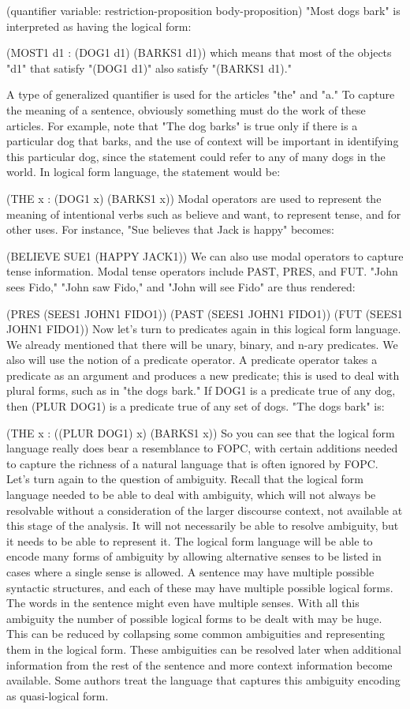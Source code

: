 (quantifier variable: restriction-proposition body-proposition)
"Most dogs bark" is interpreted as having the logical form:

(MOST1 d1 : (DOG1 d1) (BARKS1 d1))
which means that most of the objects "d1" that satisfy "(DOG1 d1)" also satisfy "(BARKS1 d1)."

A type of generalized quantifier is used for the articles "the" and "a." To capture the meaning of a sentence, obviously something must do the work of these articles. For example, note that "The dog barks" is true only if there is a particular dog that barks, and the use of context will be important in identifying this particular dog, since the statement could refer to any of many dogs in the world. In logical form language, the statement would be:

(THE x : (DOG1 x) (BARKS1 x)) 
Modal operators are used to represent the meaning of intentional verbs such as believe and want, to represent tense, and for other uses. For instance, "Sue believes that Jack is happy" becomes:

(BELIEVE SUE1 (HAPPY JACK1)) 
We can also use modal operators to capture tense information. Modal tense operators include PAST, PRES, and FUT. "John sees Fido," "John saw Fido," and "John will see Fido" are thus rendered:

(PRES (SEES1 JOHN1 FIDO1))
(PAST (SEES1 JOHN1 FIDO1))
(FUT (SEES1 JOHN1 FIDO1)) 
Now let's turn to predicates again in this logical form language. We already mentioned that there will be unary, binary, and n-ary predicates. We also will use the notion of a predicate operator. A predicate operator takes a predicate as an argument and produces a new predicate; this is used to deal with plural forms, such as in "the dogs bark." If DOG1 is a predicate true of any dog, then (PLUR DOG1) is a predicate true of any set of dogs. "The dogs bark" is:

(THE x : ((PLUR DOG1) x) (BARKS1 x)) 
So you can see that the logical form language really does bear a resemblance to FOPC, with certain additions needed to capture the richness of a natural language that is often ignored by FOPC. Let's turn again to the question of ambiguity. Recall that the logical form language needed to be able to deal with ambiguity, which will not always be resolvable without a consideration of the larger discourse context, not available at this stage of the analysis. It will not necessarily be able to resolve ambiguity, but it needs to be able to represent it. The logical form language will be able to encode many forms of ambiguity by allowing alternative senses to be listed in cases where a single sense is allowed. A sentence may have multiple possible syntactic structures, and each of these may have multiple possible logical forms. The words in the sentence might even have multiple senses. With all this ambiguity the number of possible logical forms to be dealt with may be huge. This can be reduced by collapsing some common ambiguities and representing them in the logical form. These ambiguities can be resolved later when additional information from the rest of the sentence and more context information become available. Some authors treat the language that captures this ambiguity encoding as quasi-logical form.

